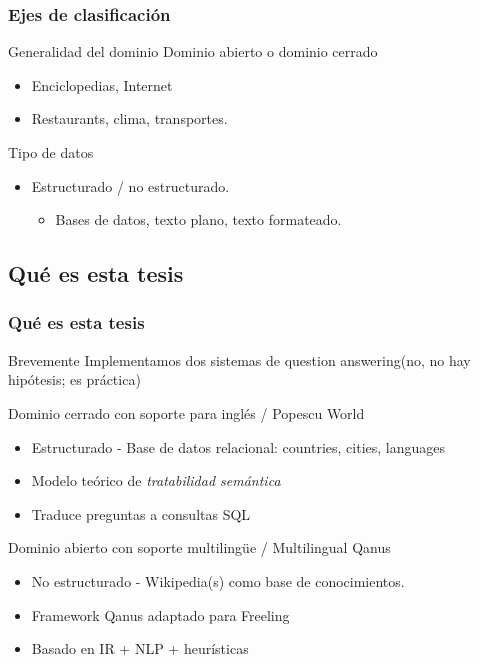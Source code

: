 \begin{frame}
  \frametitle{Ejes de clasificación}
  \begin{block}{Generalidad del dominio}
    Dominio abierto o dominio cerrado
    \begin{itemize} 
      \item Enciclopedias, Internet
      \item Restaurants, clima, transportes.
    \end{itemize}
  \end{block}


  \begin{block}{Tipo de datos}
    \begin{itemize}
      \item Estructurado / no estructurado.
      \begin{itemize}
          \item Bases de datos, texto plano, texto formateado.
      \end{itemize}
    \end{itemize}
  \end{block}
\end{frame}


\subsection{Qué es esta tesis}

\begin{frame}[<+->]\fontsize{11pt}{11}\selectfont
  \frametitle{Qué es esta tesis}
    \begin{block}{Brevemente}
      Implementamos dos sistemas de question answering\newline(no, no hay hipótesis; es práctica)
    \end{block}
    \begin{exampleblock}{Dominio cerrado con soporte para inglés / Popescu World}
      \begin{itemize}
          \item Estructurado - Base de datos relacional: countries, cities, languages
          \item Modelo teórico de \textit{tratabilidad semántica}
          \item Traduce preguntas a consultas SQL
      \end{itemize}
    \end{exampleblock}
    \begin{alertblock}{Dominio abierto con soporte multilingüe / Multilingual Qanus}
      \begin{itemize}
          \item No estructurado - Wikipedia(s) como base de conocimientos.
          \item Framework Qanus adaptado para Freeling
          \item Basado en IR + NLP + heurísticas
      \end{itemize}
    \end{alertblock}
\end{frame}